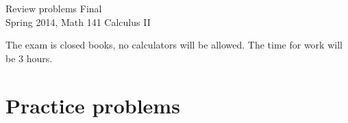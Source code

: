 \documentclass{article}
\begin{document}
\begin{center}
\Large
Review problems Final\\ Spring 2014, Math 141 Calculus II \\
\end{center}


\noindent The exam is closed books, no calculators will be allowed. The time for work will be 3 hours. 
\section{Practice problems}
\end{document}
